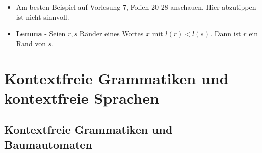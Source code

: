 \documentclass[12pt, a4paper]{article}
\begin{document}
\begin{itemize}
		\item Am besten Beispiel auf Vorlesung 7, Folien 20-28 anschauen. Hier abzutippen ist nicht sinnvoll.
		
		
		\item \textbf{Lemma} - Seien $r,s$ Ränder eines Wortes $x$ mit $l(r)<l(s)$. Dann ist $r$ ein Rand von $s$.
	\end{itemize}
	
	\section{Kontextfreie Grammatiken und kontextfreie Sprachen}
	\subsection{Kontextfreie Grammatiken und Baumautomaten}
\end{document}
